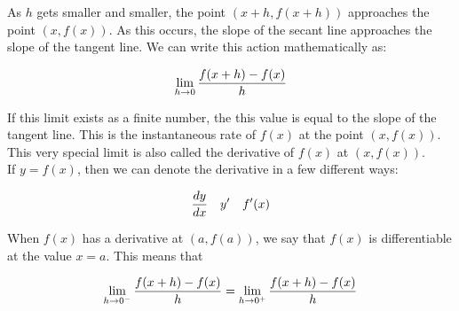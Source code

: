As $ h $ gets smaller and smaller, the point $ (x+h, f(x+h)) $ approaches the point $ (x, f(x)) $. As this occurs, the slope of the secant line approaches the slope of the tangent line. We can write this action mathematically as: \\

\begin{theorem}
    \begin{align}
        \lim\limits_{h \rightarrow 0}{f(x+h) - f(x) \over h}
    \end{align}
\end{theorem}

If this limit exists as a finite number, the this value is equal to the slope of the tangent line. This is the instantaneous rate of $ f(x) $ at the point $ (x, f(x)) $. This very special limit is also called the derivative of $ f(x) $ at $ (x, f(x)) $. \\

If $ y = f(x) $, then we can denote the derivative in a few different ways:

\begin{align}\nonumber
    {dy \over dx} &  & y' &  & f'(x)
\end{align}

When $ f(x) $ has a derivative at $ (a, f(a)) $, we say that $ f(x) $ is differentiable at the value $ x = a $. This means that \\

\begin{theorem}
    \begin{align}
        \lim\limits_{h \rightarrow 0^-}{f(x+h) - f(x) \over h} = \lim\limits_{h \rightarrow 0^+}{f(x+h) - f(x) \over h}
    \end{align}
\end{theorem}

